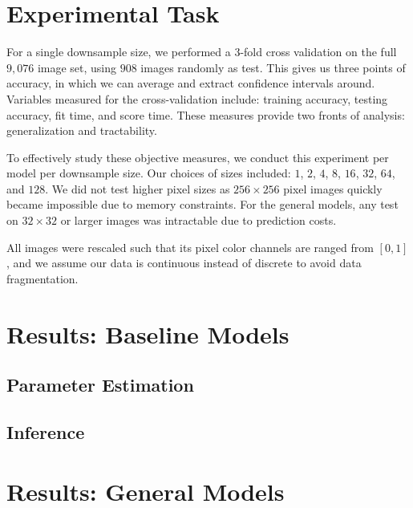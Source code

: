 \documentclass{article}
\begin{document}



\section{Experimental Task}
\label{sec:task}
For a single downsample size, we performed a $3$-fold cross validation on
the full $9,076$ image set, using $908$
images randomly as test. This gives us three points of accuracy, in which we
can average and extract confidence intervals around. Variables measured for the
cross-validation include: training accuracy, testing accuracy, fit time, and
score time. These measures provide two fronts of analysis: generalization and
tractability.

To effectively study these objective measures, we conduct this experiment
per model per downsample size. Our choices of sizes
included: $1$, $2$, $4$, $8$, $16$, $32$, $64$, and $128$. We did not test higher pixel sizes
as $256 \times 256$ pixel images quickly became impossible due to memory constraints.
For the general models, any test on $32 \times 32$ or larger images was intractable
due to prediction costs.

All images were rescaled such that its pixel color channels are ranged from
$[0, 1]$, and we assume our data is continuous instead of discrete to avoid data
fragmentation.


\section{Results: Baseline Models}
\label{sec:results-param}
\subsection{Parameter Estimation}
\subsection{Inference}


\section{Results: General Models}
\label{sec:results-inference}
\end{document}
